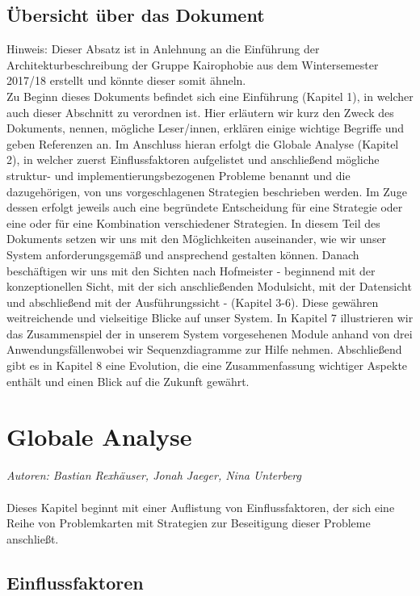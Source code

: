 \documentclass[enabledeprecatedfontcommands,fontsize=11pt,paper=a4,twoside]{scrartcl}
\newcounter{one}
\begin{document}
\subsection{Übersicht über das Dokument}
Hinweis: Dieser Absatz ist in Anlehnung an die Einführung der Architekturbeschreibung der Gruppe Kairophobie aus dem Wintersemester 2017/18 erstellt und könnte dieser somit ähneln. \\
Zu Beginn dieses Dokuments befindet sich eine Einführung (Kapitel 1), in welcher auch dieser Abschnitt zu verordnen ist. Hier erläutern wir kurz den Zweck des Dokuments, nennen, mögliche Leser/innen, erklären einige wichtige Begriffe und geben Referenzen an. 
Im Anschluss hieran erfolgt die Globale Analyse (Kapitel 2), in welcher zuerst Einflussfaktoren aufgelistet und anschließend mögliche struktur- und implementierungsbezogenen Probleme benannt und die dazugehörigen, von uns vorgeschlagenen Strategien beschrieben werden. Im Zuge dessen erfolgt jeweils auch eine begründete Entscheidung für eine Strategie oder eine oder für eine Kombination verschiedener Strategien. In diesem Teil des Dokuments setzen wir uns mit den Möglichkeiten auseinander, wie wir unser System anforderungsgemäß und ansprechend gestalten können.
Danach beschäftigen wir uns mit den Sichten nach Hofmeister - beginnend mit der konzeptionellen Sicht, mit der sich anschließenden Modulsicht, mit der Datensicht und abschließend mit der Ausführungssicht - (Kapitel 3-6). Diese gewähren weitreichende und vielseitige Blicke auf unser System.
In Kapitel 7 illustrieren wir das Zusammenspiel der in unserem System vorgesehenen Module anhand von drei Anwendungsfällenwobei wir Sequenzdiagramme zur Hilfe nehmen.
Abschließend gibt es in Kapitel 8 eine Evolution, die eine Zusammenfassung wichtiger Aspekte enthält und einen Blick auf die Zukunft gewährt.

\newpage
\section{Globale Analyse}
\label{sec:globale_analyse}

\emph{Autoren: Bastian Rexhäuser, Jonah Jaeger, Nina Unterberg}\\ \\
Dieses Kapitel beginnt mit einer Auflistung von Einflussfaktoren, der sich eine Reihe von Problemkarten mit Strategien zur Beseitigung dieser Probleme anschließt.
\subsection{Einflussfaktoren}
\label{sec:einflussfaktoren}
\end{document}
